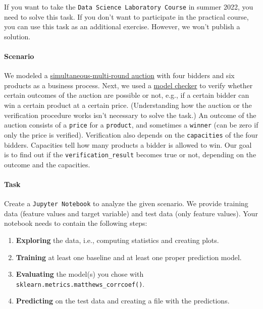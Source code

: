 \documentclass[12pt]{article}
\newcommand{\code}[1]{\textcolor{kitgreen}{\texttt{#1}}}
\begin{document}
\noindent
If you want to take the \code{Data Science Laboratory Course} in summer 2022, you need to solve this task.
If you don't want to participate in the practical course, you can use this task as an additional exercise.
However, we won't publish a solution.

\paragraph*{Scenario}

We modeled a \href{https://en.wikipedia.org/wiki/Spectrum_auction#Simultaneous_ascending_multiple-round_auction}{simultaneous-multi-round auction} with four bidders and six products as a business process.
Next, we used a \href{https://en.wikipedia.org/wiki/Model_checking}{model checker} to verify whether certain outcomes of the auction are possible or not, e.g., if a certain bidder can win a certain product at a certain price.
(Understanding how the auction or the verification procedure works isn't necessary to solve the task.)
An outcome of the auction consists of a \code{price} for a \code{product}, and sometimes a \code{winner} (can be zero if only the price is verified).
Verification also depends on the \code{capacities} of the four bidders.
Capacities tell how many products a bidder is allowed to win.
Our goal is to find out if the \code{verification\_result} becomes true or not, depending on the outcome and the capacities.

\paragraph{Task}

Create a \code{Jupyter Notebook} to analyze the given scenario.
We provide training data (feature values and target variable) and test data (only feature values).
Your notebook needs to contain the following steps:

\begin{enumerate}[left=0pt, topsep=0pt, noitemsep]
	\item \textbf{Exploring} the data, i.e., computing statistics and creating plots.
	\item \textbf{Training} at least one baseline and at least one proper prediction model.
	\item \textbf{Evaluating} the model(s) you chose with \code{sklearn.metrics.matthews\_corrcoef()}.
	\item \textbf{Predicting} on the test data and creating a file with the predictions.
\end{enumerate}
\end{document}
